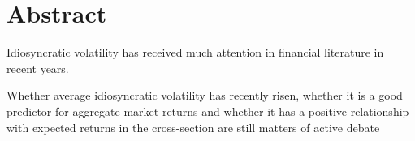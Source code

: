 \chapter{Abstract}

Idiosyncratic volatility has received much attention in financial literature in recent years. 


Whether average idiosyncratic volatility has recently risen, whether it is a good predictor for
aggregate market returns and whether it has a positive relationship with expected returns in the
cross-section are still matters of active debate